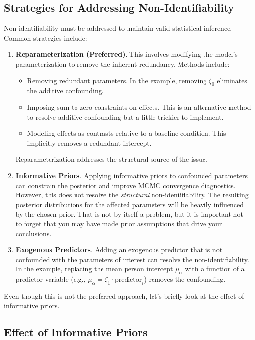 \documentclass[12pt]{article}
\begin{document}
\subsection*{Strategies for Addressing Non-Identifiability}

Non-identifiability must be addressed to maintain valid statistical inference. Common strategies include:

\begin{enumerate}[label=\bf\alph*)]
    \item \textbf{Reparameterization (Preferred)}. This involves modifying the model's parameterization to remove the inherent redundancy. Methods include:
    \begin{itemize}[label=--, itemsep=0.5ex]
        \item Removing redundant parameters. In the example, removing $\zeta_0$ eliminates the additive confounding.
        \item Imposing sum-to-zero constraints on effects. This is an alternative method to resolve additive confounding but a little trickier to implement.
        \item Modeling effects as contrasts relative to a baseline condition. This implicitly removes a redundant intercept.
    \end{itemize}
    Reparameterization addresses the structural source of the issue.
    \item \textbf{Informative Priors}. Applying informative priors to confounded parameters can constrain the posterior and improve MCMC convergence diagnostics. However, this does not resolve the \emph{structural} non-identifiability. The resulting posterior distributions for the affected parameters will be heavily influenced by the chosen prior. That is not by itself a problem, but it is important not to forget that you may have made prior assumptions that drive your conclusions.
    \item \textbf{Exogenous Predictors}. Adding an exogenous predictor that is not confounded with the parameters of interest can resolve the non-identifiability. In the example, replacing the mean person intercept $\mu_\alpha$ with a function of a predictor variable (e.g., $\mu_\alpha = \zeta_1 \cdot \text{predictor}_i$) removes the confounding.
\end{enumerate}

Even though this is not the preferred approach, let's briefly look at the effect of informative priors.

\subsection*{Effect of Informative Priors}
\end{document}
